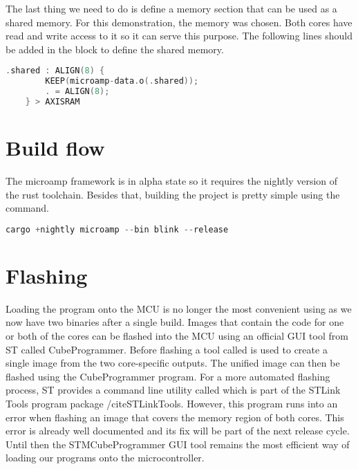 The last thing we need to do is define a memory section that can be used as a shared memory. For this demonstration, the  memory was chosen. Both cores have read and write access to it so it can serve this purpose. The following lines should be added in the  block to define the shared memory.

\begin{lstlisting}[language=C,frame=single,float=!ht,label={lst:link-shared},caption={Defining Shared Memory in Linker File}]
    .shared : ALIGN(8) {
        KEEP(microamp-data.o(.shared));
        . = ALIGN(8);
    } > AXISRAM
\end{lstlisting}

\section{Build flow}

The microamp framework is in alpha state so it requires the nightly version of the rust toolchain. Besides that, building the project is pretty simple using the  command.

\begin{lstlisting}[language=C,frame=single,float=!ht,label={lst:cargo-microamp},caption={Building a Dual Core Application with Microamp}]
    cargo +nightly microamp --bin blink --release
\end{lstlisting}

\section{Flashing}

Loading the program onto the MCU is no longer the most convenient using  as we now have two binaries after a single build. Images that contain the code for one or both of the cores can be flashed into the MCU using an official GUI tool from ST called CubeProgrammer. Before flashing a tool called  is used to create a single image from the two core-specific outputs. The unified image can then be flashed using the CubeProgrammer program. For a more automated flashing process, ST provides a command line utility called  which is part of the STLink Tools program package /cite{STLinkTools}. However, this program runs into an error when flashing an image that covers the memory region of both cores. This error \cite{STFlashError} is already well documented and its fix will be part of the next release cycle. Until then the STMCubeProgrammer GUI tool remains the most efficient way of loading our programs onto the microcontroller.
